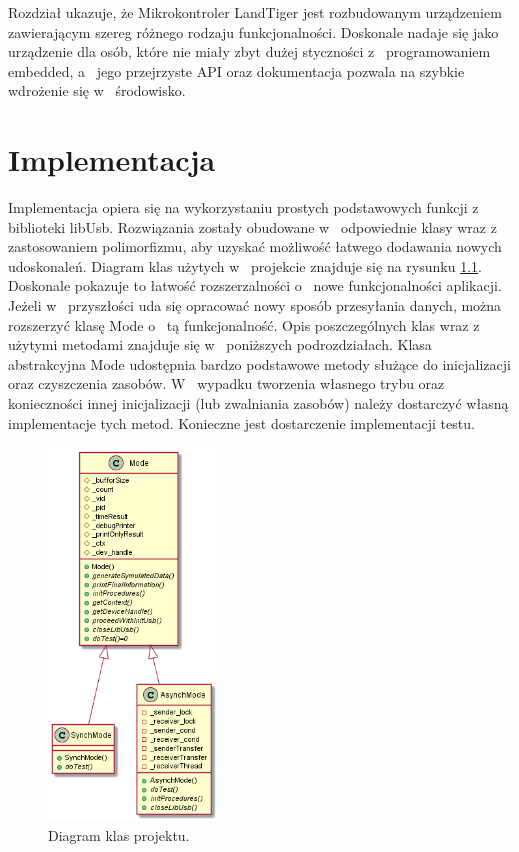 \documentclass{BscUS}
\newcommand\blankpage{%
    \null
    \thispagestyle{empty}%
    \newpage}
\begin{document}
\newline
\indent Rozdział ukazuje, że Mikrokontroler LandTiger jest rozbudowanym urządzeniem zawierającym szereg różnego rodzaju funkcjonalności. Doskonale nadaje się jako urządzenie dla osób, które nie miały zbyt dużej styczności z~ programowaniem embedded, a~ jego przejrzyste API oraz dokumentacja pozwala na szybkie wdrożenie się w~ środowisko. \cite{landtigerDesc, embeddedC, embeddedSystems, bootstrapLinUSB}
\chapter{Implementacja}
\label{implementationChapter}
Implementacja opiera się na wykorzystaniu prostych podstawowych funkcji z~ biblioteki libUsb. Rozwiązania zostały obudowane w~ odpowiednie klasy wraz z~ zastosowaniem polimorfizmu, aby uzyskać możliwość łatwego dodawania nowych udoskonaleń. Diagram klas użytych w~ projekcie znajduje się na rysunku \ref{fig:classDiagram}. Doskonale pokazuje to łatwość rozszerzalności o~ nowe funkcjonalności aplikacji. Jeżeli w~ przyszłości uda się opracować nowy sposób przesyłania danych, można rozszerzyć klasę Mode o~ tą funkcjonalność. Opis poszczególnych klas wraz z~ użytymi metodami znajduje się w~ poniższych podrozdziałach. Klasa abstrakcyjna Mode udostępnia bardzo podstawowe metody służące do inicjalizacji oraz czyszczenia zasobów. W~ wypadku tworzenia własnego trybu oraz konieczności innej inicjalizacji (lub zwalniania zasobów) należy dostarczyć własną implementacje tych metod. Konieczne jest dostarczenie implementacji testu.
\begin{figure}[H]
\centering
\includegraphics[width=0.4\textwidth]{./img/classDiagram}
\caption{Diagram klas projektu.}
\label{fig:classDiagram}
\end{figure}
\end{document}
